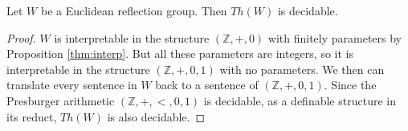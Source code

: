 \documentclass[../main.tex]{subfiles}
\begin{document}
\begin{theorem}
    Let $W$ be a Euclidean reflection group. Then $Th(W)$ is decidable.
\end{theorem}

\begin{proof}
    $W$ is interpretable in the structure $(\mathbb Z, +, 0)$ with finitely parameters by Proposition \ref{thm:interp}. But all these parameters are integers, so it is interpretable in the structure $(\mathbb Z, +, 0,1)$ with no parameters. We then can translate every sentence in $W$ back to a sentence of $(\mathbb Z, +, 0,1)$. Since the Presburger arithmetic $(\mathbb Z, +, <,0,1)$ is decidable, as a definable structure in its reduct, $Th(W)$ is also decidable.
\end{proof}
\end{document}
